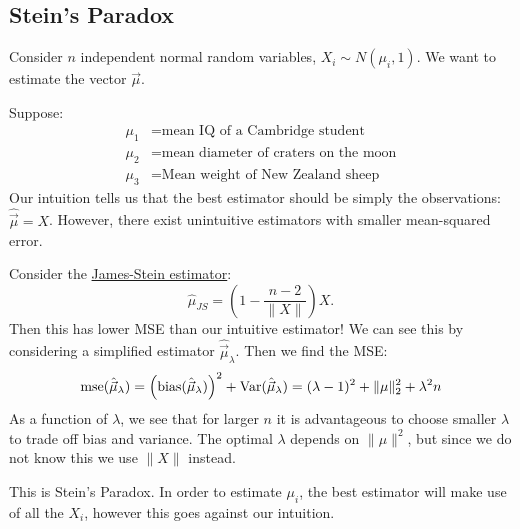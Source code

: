 \documentclass[../Main.tex]{subfiles}
\begin{document}
\subsection{Stein's Paradox}
Consider $n$ independent normal random variables, $X_i \sim N(\mu_i, 1)$. We want to estimate the vector $\vec{\mu}$.
\begin{example}
    Suppose:
    \begin{align*}
        \mu_1 &= \text{mean IQ of a Cambridge student}\\
        \mu_2 &= \text{mean diameter of craters on the moon}\\
        \mu_3 &= \text{Mean weight of New Zealand sheep}
    \end{align*}
    Our intuition tells us that the best estimator should be simply the observations: $\hat{\vec{\mu}} = X$. However, there exist unintuitive estimators with smaller mean-squared error.
    
    Consider the \underline{James-Stein estimator}:
    \begin{equation*}
        \hat{\mu}_{JS} = \left(1 - \frac{n-2}{\lVert X \rVert}\right) X.
    \end{equation*}
    Then this has lower MSE than our intuitive estimator! We can see this by considering a simplified estimator $\hat{\vec{\mu}}_{\lambda}$. Then we find the MSE:
    \begin{equation}
        \operatorname{mse}(\hat{\vec{\mu}}_{\lambda}) = \left(\operatorname{bias}(\hat{\vec{\mu}}_{\lambda})\right)^2 + \operatorname{Var}(\hat{\vec{\mu}}_{\lambda}) = (\lambda - 1)^2 + \lVert \mu \rVert_2^2 + \lambda^2 n
    \end{equation}
    As a function of $\lambda$, we see that for larger $n$ it is advantageous to choose smaller $\lambda$ to trade off bias and variance. The optimal $\lambda$ depends on $\lVert \mu \rVert^2$, but since we do not know this we use $\lVert X \rVert$ instead.
\end{example}
This is Stein's Paradox. In order to estimate $\mu_i$, the best estimator will make use of all the $X_i$, however this goes against our intuition.
\end{document}
